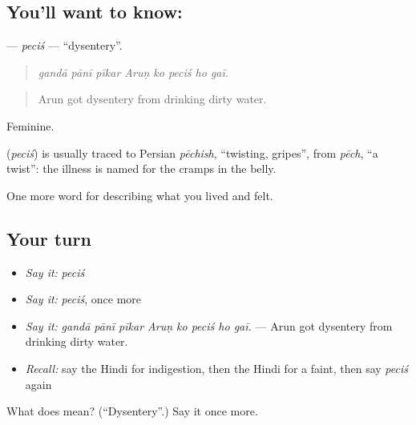 \subsection*{You'll want to know: }
\textbf{} — \emph{peciś} — \textquotedblleft{}dysentery\textquotedblright{}.

\begin{quote}
       
\end{quote}

\begin{quote}
\emph{gandā pānī pīkar Aruṇ ko peciś ho gaī.}
\end{quote}

\begin{quote}
Arun got dysentery from drinking dirty water.
\end{quote}

Feminine.

\begin{cousinweb}
\textbf{} (\emph{peciś}) is usually traced to Persian \emph{pēchish}, \textquotedblleft{}twisting, gripes\textquotedblright{}, from \emph{pēch}, \textquotedblleft{}a twist\textquotedblright{}: the illness is named for the cramps in the belly.
\end{cousinweb}

\begin{grammarlens}[title={What you've built}]
One more word for describing what you lived and felt.
\end{grammarlens}

\subsection*{Your turn}
\begin{itemize}
\raggedright
  \item \emph{Say it:} \emph{peciś}
  \item \emph{Say it:} \emph{peciś}, once more
  \item \emph{Say it:} \emph{gandā pānī pīkar Aruṇ ko peciś ho gaī.} — Arun got dysentery from drinking dirty water.
  \item \emph{Recall:} say the Hindi for indigestion, then the Hindi for a faint, then say \emph{peciś} again
\end{itemize}

\begin{tcolorbox}[breakable,colback=teal!4,colframe=teal!35!black,title={Before you move on}]
What does  mean? (\textquotedblleft{}Dysentery\textquotedblright{}.) Say it once more.
\end{tcolorbox}
